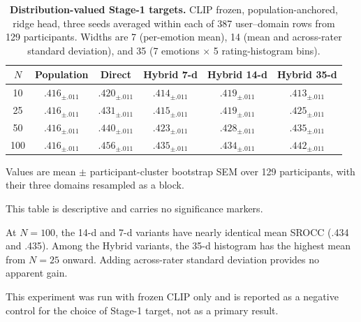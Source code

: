 \begin{table}[t]
\centering
\begin{threeparttable}
\caption{\textbf{Distribution-valued Stage-1 targets.} CLIP frozen, population-anchored, ridge head, three seeds averaged within each of 387 user--domain rows from 129 participants. Widths are 7 (per-emotion mean), 14 (mean and across-rater standard deviation), and 35 (7 emotions $\times$ 5 rating-histogram bins).}
\label{tab:distribution}
\small
\setlength{\tabcolsep}{3.5pt}
\begin{tabular}{@{}c cc ccc@{}}
\toprule
$N$ & Population & Direct & Hybrid 7-d & Hybrid 14-d & Hybrid 35-d \\
\midrule
10 & $.416_{\pm .011}$ & $.420_{\pm .011}$ & $.414_{\pm .011}$ & $.419_{\pm .011}$ & $.413_{\pm .011}$ \\
25 & $.416_{\pm .011}$ & $.431_{\pm .011}$ & $.415_{\pm .011}$ & $.419_{\pm .011}$ & $.425_{\pm .011}$ \\
50 & $.416_{\pm .011}$ & $.440_{\pm .011}$ & $.423_{\pm .011}$ & $.428_{\pm .011}$ & $.435_{\pm .011}$ \\
100 & $.416_{\pm .011}$ & $.456_{\pm .011}$ & $.435_{\pm .011}$ & $.434_{\pm .011}$ & $.442_{\pm .011}$ \\
\bottomrule
\end{tabular}
\begin{tablenotes}[flushleft]\footnotesize
\item Values are mean $\pm$ participant-cluster bootstrap SEM over 129 participants, with their three domains resampled as a block.
\item This table is descriptive and carries no significance markers.
\item At $N=100$, the 14-d and 7-d variants have nearly identical mean SROCC (.434 and .435). Among the Hybrid variants, the 35-d histogram has the highest mean from $N=25$ onward. Adding across-rater standard deviation provides no apparent gain.
\item This experiment was run with frozen CLIP only and is reported as a negative control for the choice of Stage-1 target, not as a primary result.
\end{tablenotes}
\end{threeparttable}
\end{table}

